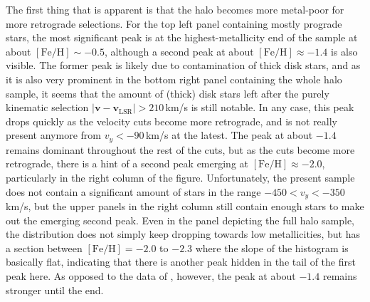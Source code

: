 \documentclass[a4paper,11pt]{article}
\begin{document}
%
The first thing that is apparent is that the halo becomes more metal-poor for more retrograde selections. For the top left panel containing mostly prograde stars, the most significant peak is at the highest-metallicity end of the sample at about $\mathrm{[Fe/H]}\sim-0.5$, although a second peak at about $\mathrm{[Fe/H]}\approx-1.4$ is also visible. The former peak is likely due to contamination of thick disk stars, and as it is also very prominent in the bottom right panel containing the whole halo sample, it seems that the amount of (thick) disk stars left after the purely kinematic selection $|\bm{v}-\bm{v}_\mathrm{LSR}|>210$\,km/s is still notable. In any case, this peak drops quickly as the velocity cuts become more retrograde, and is not really present anymore from $v_y<-90$\,km/s at the latest. The peak at about $-1.4$ remains dominant throughout the rest of the cuts, but as the cuts become more retrograde, there is a hint of a second peak emerging at $\mathrm{[Fe/H]}\approx-2.0$, particularly in the right column of the figure. Unfortunately, the present sample does not contain a significant amount of stars in the range $-450<v_y<-350$\,km/s, but the upper panels in the right column still contain enough stars to make out the emerging second peak. Even in the panel depicting the full halo sample, the distribution does not simply keep dropping towards low metallicities, but has a section between $\mathrm{[Fe/H]}=-2.0$ to $-2.3$ where the slope of the histogram is basically flat, indicating that there is another peak hidden in the tail of the first peak here. As opposed to the data of \citet{carollo07}, however, the peak at about $-1.4$ remains stronger until the end.\\ \\
%
\end{document}
